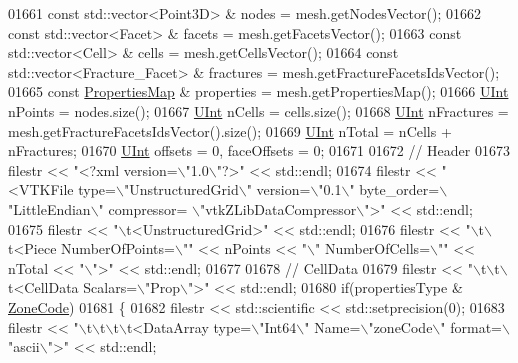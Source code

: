 \begin{DoxyCode}
01661     \textcolor{keyword}{const} std::vector<Point3D> & nodes = mesh.getNodesVector();
01662     \textcolor{keyword}{const} std::vector<Facet> & facets = mesh.getFacetsVector();
01663     \textcolor{keyword}{const} std::vector<Cell> & cells = mesh.getCellsVector();
01664     \textcolor{keyword}{const} std::vector<Fracture\_Facet> & fractures = mesh.getFractureFacetsIdsVector();
01665     \textcolor{keyword}{const} \hyperlink{classFVCode3D_1_1PropertiesMap}{PropertiesMap} & properties = mesh.getPropertiesMap();
01666     \hyperlink{namespaceFVCode3D_a4bf7e328c75d0fd504050d040ebe9eda}{UInt} nPoints = nodes.size();
01667     \hyperlink{namespaceFVCode3D_a4bf7e328c75d0fd504050d040ebe9eda}{UInt} nCells = cells.size();
01668     \hyperlink{namespaceFVCode3D_a4bf7e328c75d0fd504050d040ebe9eda}{UInt} nFractures = mesh.getFractureFacetsIdsVector().size();
01669     \hyperlink{namespaceFVCode3D_a4bf7e328c75d0fd504050d040ebe9eda}{UInt} nTotal = nCells + nFractures;
01670     \hyperlink{namespaceFVCode3D_a4bf7e328c75d0fd504050d040ebe9eda}{UInt} offsets = 0, faceOffsets = 0;
01671 
01672     \textcolor{comment}{// Header}
01673     filestr << \textcolor{stringliteral}{"<?xml version=\(\backslash\)"1.0\(\backslash\)"?>"} << std::endl;
01674     filestr << \textcolor{stringliteral}{"<VTKFile type=\(\backslash\)"UnstructuredGrid\(\backslash\)" version=\(\backslash\)"0.1\(\backslash\)" byte\_order=\(\backslash\)"LittleEndian\(\backslash\)" compressor=
      \(\backslash\)"vtkZLibDataCompressor\(\backslash\)">"} << std::endl;
01675     filestr << \textcolor{stringliteral}{"\(\backslash\)t<UnstructuredGrid>"} << std::endl;
01676     filestr << \textcolor{stringliteral}{"\(\backslash\)t\(\backslash\)t<Piece NumberOfPoints=\(\backslash\)""} << nPoints << \textcolor{stringliteral}{"\(\backslash\)" NumberOfCells=\(\backslash\)""} << nTotal << \textcolor{stringliteral}{"\(\backslash\)">"} << 
      std::endl;
01677 
01678     \textcolor{comment}{// CellData}
01679     filestr << \textcolor{stringliteral}{"\(\backslash\)t\(\backslash\)t\(\backslash\)t<CellData Scalars=\(\backslash\)"Prop\(\backslash\)">"} << std::endl;
01680     \textcolor{keywordflow}{if}(propertiesType & \hyperlink{namespaceFVCode3D_ab3abc77722284ce4344be90bb61c1a41a98a639655750204022119fd2d64ecdf0}{ZoneCode})
01681     \{
01682         filestr << std::scientific << std::setprecision(0);
01683         filestr << \textcolor{stringliteral}{"\(\backslash\)t\(\backslash\)t\(\backslash\)t\(\backslash\)t<DataArray type=\(\backslash\)"Int64\(\backslash\)" Name=\(\backslash\)"zoneCode\(\backslash\)" format=\(\backslash\)"ascii\(\backslash\)">"} << std::endl;

\end{DoxyCode}
